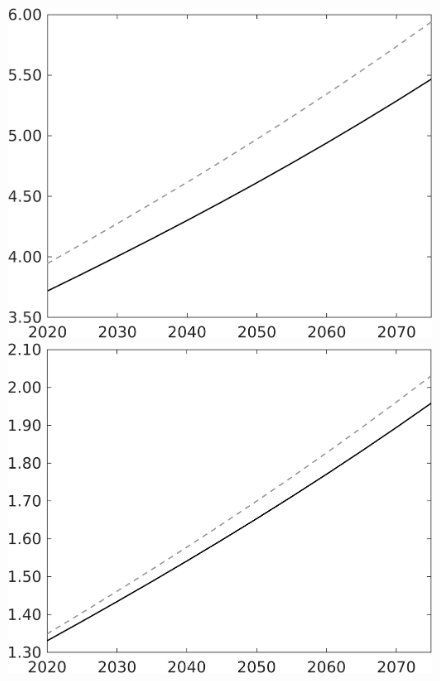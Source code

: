\documentclass[12pt]{article}
\begin{document}
\begin{figure}[h!!]
\begin{minipage}[]{0.32\textwidth}
	\end{minipage}	
	\begin{minipage}[]{0.32\textwidth}
		\includegraphics[width=1\textwidth]{../../codding_model/own_basedOnFried/optimalPol_010922_revision/figures/all_13Sept22/LevTaufNoTauf_TaulCalib_regime0_wh_spillover0_nsk1_xgr0_knspil1_sep1_LFlimit0_emsbase0_countec0_GovRev0_etaa0.79_lgd0.png}
	\end{minipage}	
	\begin{minipage}[]{0.32\textwidth}
		\includegraphics[width=1\textwidth]{../../codding_model/own_basedOnFried/optimalPol_010922_revision/figures/all_13Sept22/LevTaufNoTauf_TaulCalib_regime0_C_spillover0_nsk1_xgr0_knspil1_sep1_LFlimit0_emsbase0_countec0_GovRev0_etaa0.79_lgd0.png}

\end{minipage}
\end{figure}
\end{document}
